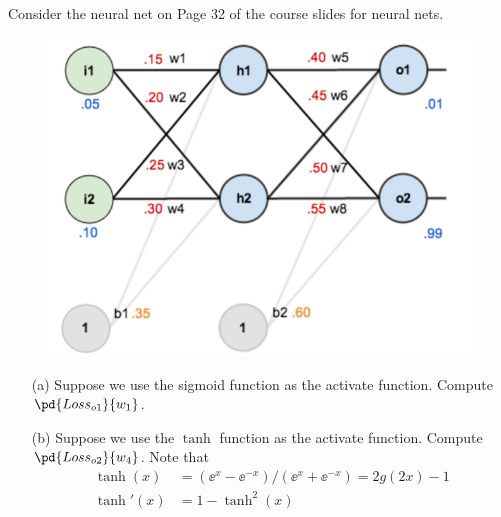 \documentclass[a4paper, 11pt]{article}
\begin{document}
\begin{question}\normalfont
Consider the neural net on Page 32 of the course slides for neural nets.
\begin{figure}
\centering
\includegraphics[width=0.5\linewidth]{fig/neural_net.png}
\end{figure}
\begin{itemize}
\item[(a)] Suppose we use the sigmoid function as the activate function. Compute $\pd{Loss_{o1}}{w_1}$.
\item[(b)] Suppose we use the $\tanh$ function as the activate function. Compute $\pd{Loss_{o2}}{w_4}$. Note that
\[\begin{aligned}
    \tanh(x) &= (\ee^x - \ee^{-x})/(\ee^x + \ee^{-x}) = 2g(2x) - 1\\
    \tanh'(x) &= 1 - \tanh^2(x)
\end{aligned}\]
\end{itemize}
\end{question}
\end{document}
